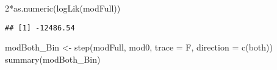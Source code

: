 \documentclass[
]{article}
\newenvironment{Shaded}{\begin{snugshade}}{\end{snugshade}}
\newcommand{\AttributeTok}[1]{\textcolor[rgb]{0.77,0.63,0.00}{#1}}
\newcommand{\DecValTok}[1]{\textcolor[rgb]{0.00,0.00,0.81}{#1}}
\newcommand{\FunctionTok}[1]{\textcolor[rgb]{0.00,0.00,0.00}{#1}}
\newcommand{\NormalTok}[1]{#1}
\newcommand{\OtherTok}[1]{\textcolor[rgb]{0.56,0.35,0.01}{#1}}
\newcommand{\SpecialCharTok}[1]{\textcolor[rgb]{0.00,0.00,0.00}{#1}}
\newcommand{\StringTok}[1]{\textcolor[rgb]{0.31,0.60,0.02}{#1}}
\begin{document}
\begin{Shaded}
\begin{Highlighting}[]
\DecValTok{2}\SpecialCharTok{*}\FunctionTok{as.numeric}\NormalTok{(}\FunctionTok{logLik}\NormalTok{(modFull))}
\end{Highlighting}
\end{Shaded}

\begin{verbatim}
## [1] -12486.54
\end{verbatim}

\begin{Shaded}
\begin{Highlighting}[]
\NormalTok{modBoth\_Bin }\OtherTok{\textless{}{-}} \FunctionTok{step}\NormalTok{(modFull, mod0, }\AttributeTok{trace =}\NormalTok{ F, }\AttributeTok{direction =} \FunctionTok{c}\NormalTok{(}\StringTok{\textquotesingle{}both\textquotesingle{}}\NormalTok{))}
\FunctionTok{summary}\NormalTok{(modBoth\_Bin)}
\end{Highlighting}
\end{Shaded}
\end{document}
